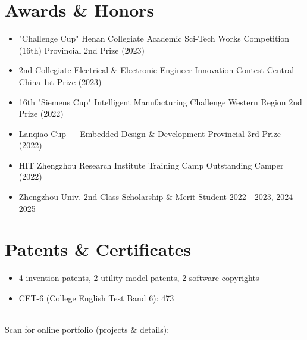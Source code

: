 \documentclass{resume-photo}
\begin{document}
\section{Awards \& Honors}
\begin{itemize}
  \item "Challenge Cup" Henan Collegiate Academic Sci-Tech Works Competition (16th) \hfill Provincial 2nd Prize (2023)
  \item 2nd Collegiate Electrical \& Electronic Engineer Innovation Contest \hfill Central-China 1st Prize (2023)
  \item 16th "Siemens Cup" Intelligent Manufacturing Challenge \hfill Western Region 2nd Prize (2022)
  \item Lanqiao Cup — Embedded Design \& Development \hfill Provincial 3rd Prize (2022)
  \item HIT Zhengzhou Research Institute Training Camp \hfill Outstanding Camper (2022)
  \item Zhengzhou Univ. 2nd-Class Scholarship \& Merit Student \hfill 2022—2023, 2024—2025
\end{itemize}

\section{Patents \& Certificates}
\begin{itemize}
  \item 4 invention patents, 2 utility-model patents, 2 software copyrights
  \item CET-6 (College English Test Band 6): 473
\end{itemize}

\vfill
\begin{center}
  \\[4pt]
  {\footnotesize Scan for online portfolio (projects \& details): }
\end{center}
\end{document}
